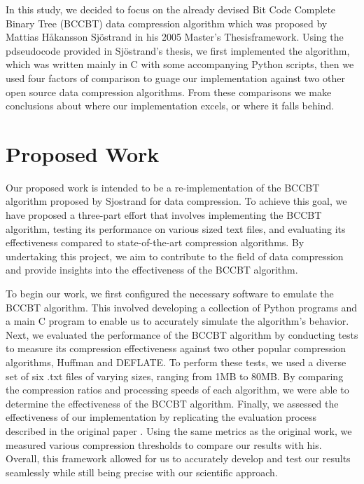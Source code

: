 \documentclass[12pt]{IEEEtran}
\begin{document}
In this study, we decided to focus on the already devised Bit Code Complete Binary Tree (BCCBT) data compression algorithm
which was
proposed by Mattias Håkansson Sjöstrand in his 2005 Master's Thesisframework.
Using the pdseudocode provided in
Sjöstrand's thesis, we first implemented the algorithm, which was written mainly in C with some accompanying Python scripts, then we used four factors of comparison
to guage our implementation against two other open source data compression algorithms. From these comparisons we make conclusions about where our
implementation excels, or where it falls behind.

\section{Proposed Work}
Our proposed work is intended to be a re-implementation of the BCCBT algorithm proposed by Sjostrand for data compression. 
To achieve this goal, we have proposed a three-part effort that involves implementing the BCCBT algorithm, testing its performance on 
various sized text files, and evaluating its effectiveness compared to state-of-the-art compression algorithms. By undertaking this 
project, we aim to contribute to the field of data compression and provide insights into the effectiveness of the BCCBT algorithm.

To begin our work, we first configured the necessary software to emulate the BCCBT algorithm. This involved developing a collection of Python 
programs and a main C program to enable us to accurately simulate the algorithm's behavior.
Next, we evaluated the performance of the BCCBT algorithm by conducting tests to measure its 
compression effectiveness against two other popular compression algorithms, Huffman and DEFLATE. 
To perform these tests, we used a diverse set of six .txt files of varying sizes, ranging from 1MB to 80MB. 
By comparing the compression ratios and processing speeds of each algorithm, we were able to determine the effectiveness of the BCCBT algorithm.
Finally, we assessed the effectiveness of our implementation by replicating the evaluation process described in the original paper \cite{Sjostrand}. 
Using the same metrics as the original work, we measured various compression thresholds to compare our results with his.\\ 
Overall, this framework allowed for us to accurately develop and test our results seamlessly while still being precise with our scientific approach.
\end{document}

